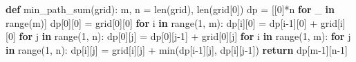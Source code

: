 \documentclass[11pt]{article}
\newenvironment{Shaded}{\begin{snugshade}}{\end{snugshade}}
\newcommand{\BuiltInTok}[1]{\textcolor[rgb]{0.50,0.55,0.55}{#1}}
\newcommand{\ControlFlowTok}[1]{\textcolor[rgb]{0.99,0.74,0.29}{\textbf{#1}}}
\newcommand{\DecValTok}[1]{\textcolor[rgb]{0.96,0.45,0.00}{#1}}
\newcommand{\KeywordTok}[1]{\textcolor[rgb]{0.81,0.81,0.76}{\textbf{#1}}}
\newcommand{\NormalTok}[1]{\textcolor[rgb]{0.81,0.81,0.76}{#1}}
\newcommand{\OperatorTok}[1]{\textcolor[rgb]{0.81,0.81,0.76}{#1}}
\begin{document}
\begin{Shaded}
\begin{Highlighting}[]
\KeywordTok{def}\NormalTok{ min\_path\_sum(grid):}
\NormalTok{    m, n }\OperatorTok{=} \BuiltInTok{len}\NormalTok{(grid), }\BuiltInTok{len}\NormalTok{(grid[}\DecValTok{0}\NormalTok{])}
\NormalTok{    dp }\OperatorTok{=}\NormalTok{ [[}\DecValTok{0}\NormalTok{]}\OperatorTok{*}\NormalTok{n }\ControlFlowTok{for}\NormalTok{ \_ }\KeywordTok{in} \BuiltInTok{range}\NormalTok{(m)]}
\NormalTok{    dp[}\DecValTok{0}\NormalTok{][}\DecValTok{0}\NormalTok{] }\OperatorTok{=}\NormalTok{ grid[}\DecValTok{0}\NormalTok{][}\DecValTok{0}\NormalTok{]}
    \ControlFlowTok{for}\NormalTok{ i }\KeywordTok{in} \BuiltInTok{range}\NormalTok{(}\DecValTok{1}\NormalTok{, m): dp[i][}\DecValTok{0}\NormalTok{] }\OperatorTok{=}\NormalTok{ dp[i}\OperatorTok{{-}}\DecValTok{1}\NormalTok{][}\DecValTok{0}\NormalTok{] }\OperatorTok{+}\NormalTok{ grid[i][}\DecValTok{0}\NormalTok{]}
    \ControlFlowTok{for}\NormalTok{ j }\KeywordTok{in} \BuiltInTok{range}\NormalTok{(}\DecValTok{1}\NormalTok{, n): dp[}\DecValTok{0}\NormalTok{][j] }\OperatorTok{=}\NormalTok{ dp[}\DecValTok{0}\NormalTok{][j}\OperatorTok{{-}}\DecValTok{1}\NormalTok{] }\OperatorTok{+}\NormalTok{ grid[}\DecValTok{0}\NormalTok{][j]}
    \ControlFlowTok{for}\NormalTok{ i }\KeywordTok{in} \BuiltInTok{range}\NormalTok{(}\DecValTok{1}\NormalTok{, m):}
        \ControlFlowTok{for}\NormalTok{ j }\KeywordTok{in} \BuiltInTok{range}\NormalTok{(}\DecValTok{1}\NormalTok{, n):}
\NormalTok{            dp[i][j] }\OperatorTok{=}\NormalTok{ grid[i][j] }\OperatorTok{+} \BuiltInTok{min}\NormalTok{(dp[i}\OperatorTok{{-}}\DecValTok{1}\NormalTok{][j], dp[i][j}\OperatorTok{{-}}\DecValTok{1}\NormalTok{])}
    \ControlFlowTok{return}\NormalTok{ dp[m}\OperatorTok{{-}}\DecValTok{1}\NormalTok{][n}\OperatorTok{{-}}\DecValTok{1}\NormalTok{]}


\end{Highlighting}
\end{Shaded}
\end{document}
